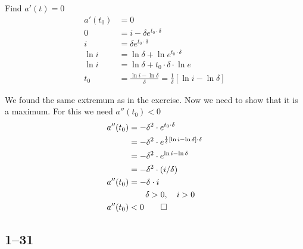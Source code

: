 \documentclass[a4paper, 12pt, reqno]{amsart}
\numberwithin{equation}{section}
\begin{document}
Find $a'(t) = 0$
\begin{equation}\nonumber
    \begin{aligned}
        a'(t_0) &= 0 \\
        0 &= i -\delta e^{t_0 \cdot \delta}                       \\
        i &= \delta e^{t_0 \cdot \delta}                          \\
        \ln{i} &= \ln{\delta} + \ln{e^{t_0 \cdot \delta}}         \\
        \ln{i} &= \ln{\delta} + t_0 \cdot \delta \cdot \ln{e}     \\
        t_0 &= \frac{\ln{i} - \ln{\delta}}{\delta} = 
            \frac{1}{\delta}[ \ln{i} - \ln{\delta}]
    \end{aligned}
\end{equation}

We found the same extremum as in the exercise. Now we need to show that it is
a maximum. For this we need $a''(t_0) < 0$
\begin{equation}\nonumber
    \begin{aligned}
        a''(t_0) &= -\delta^2 \cdot e^{t_0 \cdot \delta}        \\
        &= -\delta^2 \cdot e^{\frac{1}{\delta}[ \ln{i} - \ln{\delta}] 
            \cdot \delta}                                       \\
        &= -\delta^2 \cdot e^{\ln{i} - \ln{\delta}}             \\
        &= -\delta^2 \cdot (i / \delta)                         \\
        a''(t_0) &= -\delta \cdot i                  \\
        &\qquad \delta > 0, \quad i > 0       \\
        a''(t_0) &< 0    \qed
    \end{aligned}
\end{equation}


\subsection*{1--31}
\end{document}
